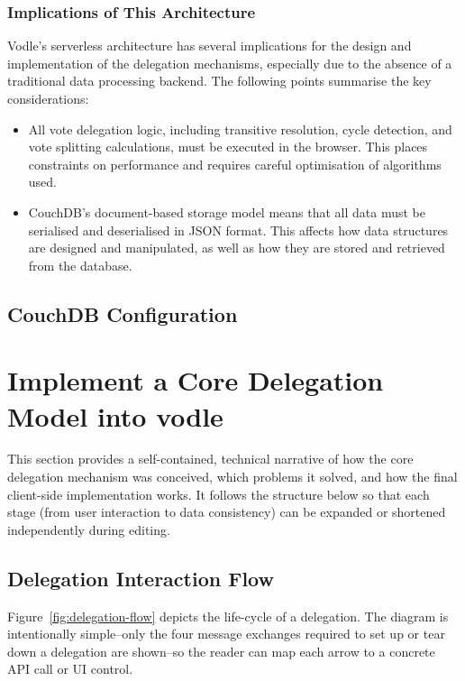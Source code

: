 \subsubsection{Implications of This Architecture}
Vodle's serverless architecture has several implications for the design and implementation of the delegation mechanisms, especially due to the absence of a traditional data processing backend. The following points summarise the key considerations:
\begin{itemize}
  \item All vote delegation logic, including transitive resolution, cycle detection, and vote splitting calculations, must be executed in the browser. This places constraints on performance and requires careful optimisation of algorithms used.
  \item CouchDB's document-based storage model means that all data must be serialised and deserialised in JSON format. This affects how data structures are designed and manipulated, as well as how they are stored and retrieved from the database.
\end{itemize}

\subsection{CouchDB Configuration}
%
%

\section{Implement a Core Delegation Model into vodle}
\label{sec:core_delegation_detailed}

This section provides a self-contained, technical narrative of how the core delegation mechanism was conceived, which problems it solved, and how the final client-side implementation works. It follows the structure below so that each stage (from user interaction to data consistency) can be expanded or shortened independently during editing.

\subsection{Delegation Interaction Flow}
Figure~\ref{fig:delegation-flow} depicts the life-cycle of a delegation. The diagram is intentionally simple--only the four message exchanges required to set up or tear down a delegation are shown--so the reader can map each arrow to a concrete API call or UI control.


